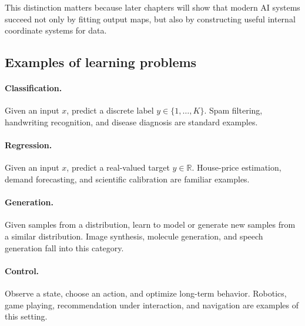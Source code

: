 This distinction matters because later chapters will show that modern AI systems succeed not only by fitting output maps, but also by constructing useful internal coordinate systems for data.

\subsection*{Examples of learning problems}

\paragraph{Classification.}
Given an input $x$, predict a discrete label $y\in\{1,\dots,K\}$. Spam filtering, handwriting recognition, and disease diagnosis are standard examples.

\paragraph{Regression.}
Given an input $x$, predict a real-valued target $y\in\mathbb R$. House-price estimation, demand forecasting, and scientific calibration are familiar examples.

\paragraph{Generation.}
Given samples from a distribution, learn to model or generate new samples from a similar distribution. Image synthesis, molecule generation, and speech generation fall into this category.

\paragraph{Control.}
Observe a state, choose an action, and optimize long-term behavior. Robotics, game playing, recommendation under interaction, and navigation are examples of this setting.



